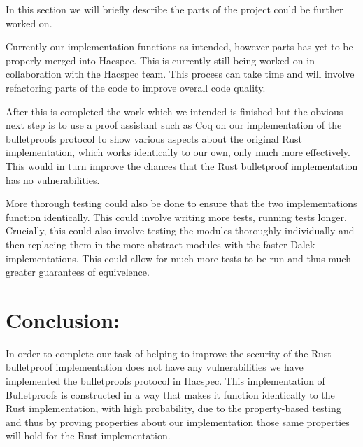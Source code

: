 \documentclass{article}
\begin{document}
In this section we will briefly describe the parts of the project
could be further worked on.

Currently our implementation functions as intended, however parts has
yet to be properly merged into Hacspec. This is currently still being
worked on in collaboration with the Hacspec team. This process can
take time and will involve refactoring parts of the code to improve
overall code quality.

After this is completed the work which we intended is finished but
the obvious next step is to use a proof assistant such as Coq on our
implementation of the bulletproofs protocol to show various aspects
about the original Rust implementation, which works identically to
our own, only much more effectively. This would in turn improve the
chances that the Rust bulletproof implementation has no vulnerabilities.

More thorough testing could also be done to ensure that the two
implementations function identically. This could involve writing more
tests, running tests longer. Crucially, this could also involve testing
the modules thoroughly individually and then replacing them in the
more abstract modules with the faster Dalek implementations. This could
allow for much more tests to be run and thus much greater guarantees
of equivelence.


\section{Conclusion:}



In order to complete our task of helping to improve the security of the 
Rust bulletproof implementation does not have any vulnerabilities we 
have implemented the bulletproofs protocol in Hacspec. This 
implementation of Bulletproofs is constructed in a way that makes it 
function identically to the Rust implementation, with high probability, 
due to the property-based testing and thus by proving properties about 
our implementation those same properties will hold for the Rust 
implementation.
\end{document}
